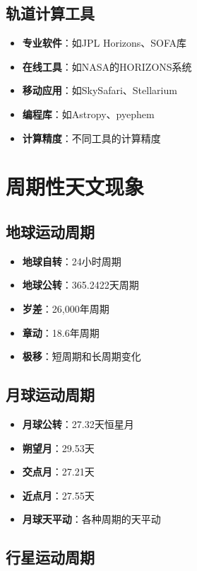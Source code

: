 \documentclass[12pt,UTF8]{ctexbook}
\begin{document}
\section{轨道计算工具}

\begin{itemize}
  \item \textbf{专业软件}：如JPL Horizons、SOFA库
  \item \textbf{在线工具}：如NASA的HORIZONS系统
  \item \textbf{移动应用}：如SkySafari、Stellarium
  \item \textbf{编程库}：如Astropy、pyephem
  \item \textbf{计算精度}：不同工具的计算精度
\end{itemize}

\chapter{周期性天文现象}
\section{地球运动周期}

\begin{itemize}
  \item \textbf{地球自转}：24小时周期
  \item \textbf{地球公转}：365.2422天周期
  \item \textbf{岁差}：26,000年周期
  \item \textbf{章动}：18.6年周期
  \item \textbf{极移}：短周期和长周期变化
\end{itemize}

\section{月球运动周期}

\begin{itemize}
  \item \textbf{月球公转}：27.32天恒星月
  \item \textbf{朔望月}：29.53天
  \item \textbf{交点月}：27.21天
  \item \textbf{近点月}：27.55天
  \item \textbf{月球天平动}：各种周期的天平动
\end{itemize}

\section{行星运动周期}
\end{document}
